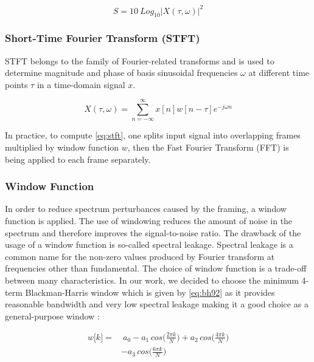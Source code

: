 \documentclass[a4paper,conference]{IEEEtran}
\begin{document}
\begin{equation}
    S=10\:Log_{10}|X(\tau, \omega)|^2
    \label{eq:spec}
\end{equation}

\subsubsection{Short-Time Fourier Transform (STFT)}
STFT belongs to the family of Fourier-related transforms and is used to determine magnitude and phase of basis sinusoidal frequencies $\omega$ at different time points $\tau$ in a time-domain signal $x$.

\begin{equation}
    X(\tau, \omega) = \sum_{n = -\infty}^{\infty} x[n]w[n - \tau] e^{-j \omega n}
    \label{eq:stft}
\end{equation}

In practice, to compute \autoref{eq:stft}, one splits input signal into overlapping frames multiplied by window function $w$, then the Fast Fourier Transform (FFT) \cite{cooley1965fft} is being applied to each frame separately.

\subsubsection{Window Function}
In order to reduce spectrum perturbances caused by the framing, a window function is applied.
The use of windowing reduces the amount of noise in the spectrum and therefore improves the signal-to-noise ratio.
The drawback of the usage of a window function is so-called spectral leakage.
Spectral leakage is a common name for the non-zero values produced by Fourier transform at frequencies other than fundamental.
The choice of window function is a trade-off between many characteristics.
In our work, we decided to choose the minimum \mbox{4-term} \mbox{Blackman-Harris} window \cite{harris1978window} which is given by \autoref{eq:bh92} as it provides reasonable bandwidth and very low spectral leakage making it a good choice as a \mbox{general-purpose} window \cite{heinzel2002spectrum}:

\begin{equation}
\begin{split}
    w{[}k{]} = &\   a_0 - a_1\,cos\bigg(\frac{2 \pi k}{N}\bigg) +  a_2\,cos\bigg(\frac{4 \pi k}{N}\bigg) \\ & - a_3\,cos\bigg(\frac{6 \pi k}{N}\bigg)
\end{split}
\label{eq:bh92}
\end{equation}
\end{document}
